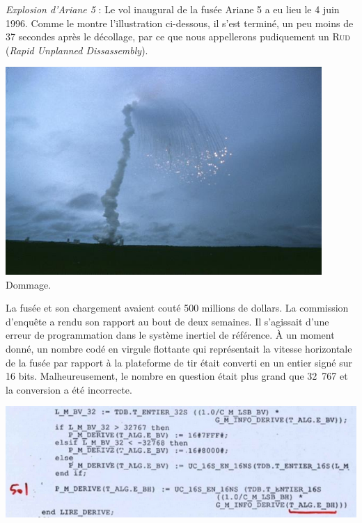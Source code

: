 \documentclass{magnolia}
\begin{document}
\begin{remarques}
  \remarque \emph{Explosion d'Ariane 5} :
  Le vol inaugural de la fusée Ariane 5 a eu lieu le 4 juin 1996.
  Comme le montre l'illustration ci-dessous, il s'est terminé, un peu
  moins de 37 secondes après le décollage, par ce que nous appellerons
  pudiquement un \textsc{Rud} (\emph{Rapid Unplanned Dissassembly}).
  \begin{center}
    \includegraphics[width = 12cm]{../../Commun/Images/info-cours-memoire-explosion_ariane}\\
    Dommage.
  \end{center}
  \vspace{1ex}
  La fusée et son chargement avaient couté 500
  millions de dollars. La commission d'enquête a rendu son rapport au bout de
  deux semaines. Il s'agissait d'une erreur de programmation dans le système
  inertiel de référence. À un moment donné, un nombre codé en virgule flottante
  qui représentait la vitesse horizontale de la fusée par rapport à la
  plateforme de tir était converti en un entier signé sur 16 bits. Malheureusement, le
  nombre en question était plus grand que 32\ 767 et la conversion a été incorrecte.
  \vspace{1ex}
  \begin{center}
    \includegraphics[width = 14cm]{../../Commun/Images/info-cours-memoire-code_ariane}\\

\end{center}
\end{remarques}
\end{document}
